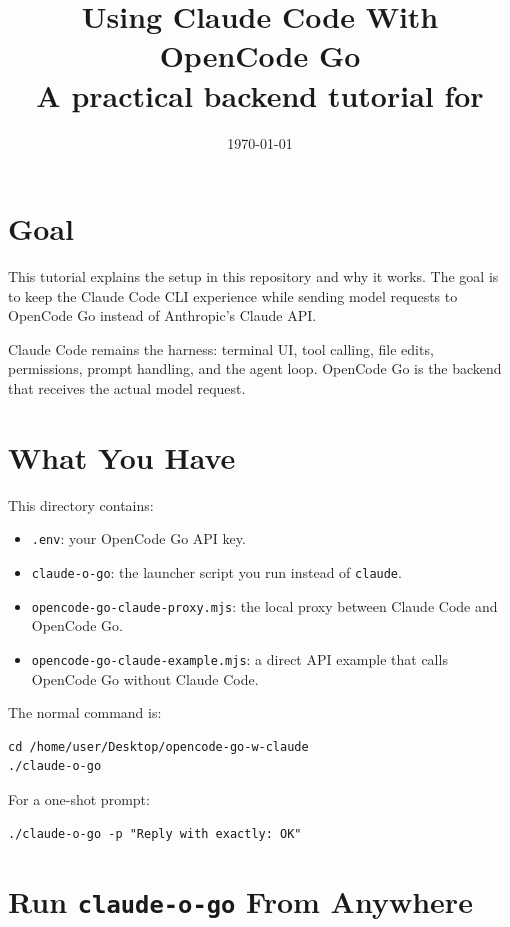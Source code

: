 \documentclass[11pt,a4paper]{article}
\title{\Huge Using Claude Code With OpenCode Go\\[0.4em]\Large A practical backend tutorial for \code{claude-o-go}}
\author{\code{claude-o-go}}
\date{\today}
\newcommand{\code}[1]{\texttt{#1}}
\begin{document}
\maketitle
\tableofcontents
\newpage

\section{Goal}

This tutorial explains the setup in this repository and why it works.
The goal is to keep the Claude Code CLI experience while sending model
requests to OpenCode Go instead of Anthropic's Claude API.

Claude Code remains the harness: terminal UI, tool calling, file edits,
permissions, prompt handling, and the agent loop. OpenCode Go is the backend
that receives the actual model request.

\section{What You Have}

This directory contains:

\begin{itemize}
  \item \code{.env}: your OpenCode Go API key.
  \item \code{claude-o-go}: the launcher script you run instead of \code{claude}.
  \item \code{opencode-go-claude-proxy.mjs}: the local proxy between Claude Code and OpenCode Go.
  \item \code{opencode-go-claude-example.mjs}: a direct API example that calls OpenCode Go without Claude Code.
\end{itemize}

The normal command is:

\begin{verbatim}
cd /home/user/Desktop/opencode-go-w-claude
./claude-o-go
\end{verbatim}

For a one-shot prompt:

\begin{verbatim}
./claude-o-go -p "Reply with exactly: OK"
\end{verbatim}

\section{Run \code{claude-o-go} From Anywhere}
\end{document}
